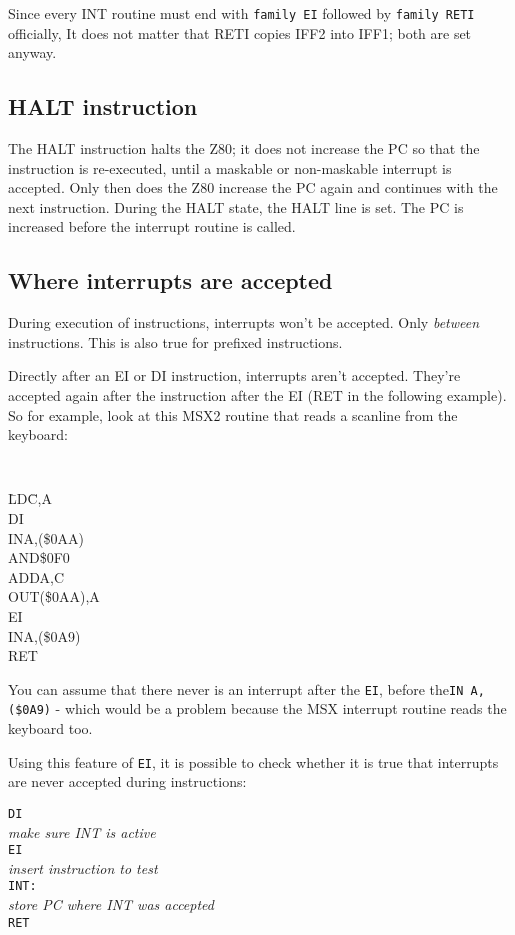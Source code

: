 \documentclass[twoside,openright,a4paper]{book}
\begin{document}
Since every INT routine must end with {\tt family EI} followed by {\tt family RETI} officially, It does not matter that RETI copies IFF2 into IFF1; both are set anyway.


\subsection{HALT instruction}

The HALT instruction halts the Z80; it does not increase the PC so that the instruction is re-executed, until a maskable or non-maskable interrupt is accepted. Only then does the Z80 increase the PC again and continues with the next instruction. During the HALT state, the HALT line is set. The PC is increased before the interrupt routine is called.


\subsection{Where interrupts are accepted}

During execution of instructions, interrupts won't be accepted. Only {\em between} instructions. This is also true for prefixed instructions.

Directly after an EI or DI instruction, interrupts aren't accepted. They're accepted again after the instruction after the EI (RET in the following example). So for example, look at this MSX2 routine that reads a scanline from the keyboard:

{\tt 
	\begin{tabbing}
		{\qquad}\=LD{\qquad}\=C,A\+\\
		DI\\
		IN\>A,(\$0AA)\\
		AND\>\$0F0\\
		ADD\>A,C\\
		OUT\>(\$0AA),A\\
		EI\\
		IN\>A,(\$0A9)\\
		RET
	\end{tabbing}
}


You can assume that there never is an interrupt after the {\tt EI}, before the{\tt IN A,(\$0A9)} - which would be a problem because the MSX interrupt routine reads the keyboard too.

Using this feature of {\tt EI}, it is possible to check whether it is true that interrupts are never accepted during instructions:

\begin{tabbing}
	{\qquad}\={\tt DI}\+\\
	{\em make sure INT is active}\\
	{\tt EI}\\
	{\em insert instruction to test}\-\\
	{\tt INT:}\+\\
	{\em store PC where INT was accepted}\\
	{\tt RET}
\end{tabbing}
\end{document}
